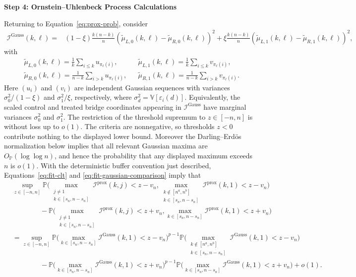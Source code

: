 \documentclass[10pt]{article}
\def\P{\mathbb{P}}
\def\V{\mathbb{V}}
\def\I{\mathscr{I}}
\theoremstyle{definition}
\theoremstyle{remark}
\begin{document}
\begin{center}
    \textbf{Step 4: Ornstein--Uhlenbeck Process Calculations}
\end{center}

Returning to Equation~\eqref{eq:prox-prob}, consider
\begin{align*}
    \I^\text{Gauss}(k, \ell) = & (1 - \xi)  \frac{k (n - k)}{n} (\tilde \mu_{L,0}(k,\ell) - \tilde \mu_{R,0}(k,\ell))^2  + \xi \frac{k (n - k)}{n} (\tilde \mu_{L,1}(k,\ell) -  \tilde \mu_{R,1}(k,\ell))^2,
\end{align*}
with 
\begin{align*}
    & \tilde \mu_{L,0}(k,\ell) = \frac{1}{k}\sum_{i \leq k} u_{\pi_{\ell}(i)}, && \tilde \mu_{L,1}(k,\ell)  =  \frac{1}{k}\sum_{i \leq k} v_{\pi_{\ell}(i)}, \\
    & \tilde \mu_{R,0}(k,\ell) = \frac{1}{n - k}\sum_{i > k} u_{\pi_{\ell}(i)}, && \tilde \mu_{R,1}(k,\ell) = \frac{1}{n - k}\sum_{i > k} v_{\pi_{\ell}(i)}.
\end{align*}
Here $(u_i)$ and $(v_i)$ are independent Gaussian sequences with variances
$\sigma_0^2/(1-\xi)$ and $\sigma_1^2/\xi$, respectively, where
$\sigma_d^2=\V[\varepsilon_i(d)]$. Equivalently, the scaled control and
treated bridge coordinates appearing in $\I^\text{Gauss}$ have marginal
variances $\sigma_0^2$ and $\sigma_1^2$.
The restriction of the threshold supremum to $z\in[-n,n]$ is without loss up to $o(1)$. The criteria are nonnegative, so thresholds $z<0$ contribute nothing to the displayed lower bound. Moreover the Darling--Erd\"os normalization below implies that all relevant Gaussian maxima are $O_\P(\log\log n)$, and hence the probability that any displayed maximum exceeds $n$ is $o(1)$.
With the deterministic buffer convention just described, Equations~\eqref{eq:fit-clt} and \eqref{eq:fit-gaussian-comparison} imply that
\begin{align*}
    & \sup_{z \in [-n,n]} \mathbb{P}\Big(\max_{\substack{j\neq 1 \\ k \in [s_n, n - s_n]}}\I^{\text{prox}}(k,j) < z - v_n, \max_{\substack{k \notin [n^a,n^b] \\ k \in [s_n, n - s_n]}} \I^{\text{prox}}(k,1) < z - v_n\Big) \\
    & \qquad \qquad - \mathbb{P}\Big(\max_{\substack{j\neq 1 \\ k \in [s_n, n - s_n]}}\I^{\text{prox}}(k,j) < z + v_n, \max_{k \in [s_n, n - s_n]} \I^{\text{prox}}(k,1) < z + v_n\Big) \\
    & = \sup_{z \in [-n, n]}\mathbb{P}\Big(\max_{k \in [s_n, n - s_n]}\I^{\text{Gauss}}(k,1) < z - v_n \Big)^{p-1} \P \Big( \max_{\substack{k \notin [n^a,n^b] \\ k \in [s_n, n - s_n]}} \I^{\text{Gauss}}(k,1) < z - v_n\Big) \\
    & \qquad \qquad - \mathbb{P}\Big(\max_{k \in [s_n, n - s_n]}\I^{\text{Gauss}}(k,1) < z + v_n \Big)^{p-1} \P \Big(\max_{k \in [s_n, n - s_n]} \I^{\text{Gauss}}(k,1) < z + v_n\Big) + o(1).
\end{align*}
\end{document}
